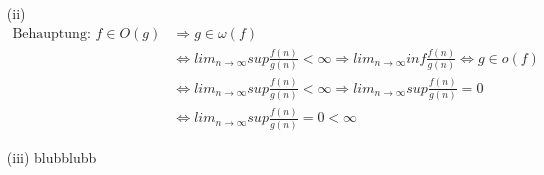 \documentclass{article}
\begin{document}
\begin{enumerate}
\begin{enumerate}
\item[(ii)]
	\begin{align*}
		\text{Behauptung: } f \in O(g) &\Rightarrow g \in \omega(f) \\
		&\Leftrightarrow lim_{n \rightarrow \infty} sup \frac{f(n)}{g(n)} 
			< \infty \Rightarrow lim_{n \rightarrow \infty} inf 
			\frac{f(n)}{g(n)} \Leftrightarrow g \in o(f) \\
		&\Leftrightarrow lim_{n \rightarrow \infty} sup \frac{f(n)}{g(n)} 
			< \infty \Rightarrow lim_{n \rightarrow \infty} sup
                        \frac{f(n)}{g(n)} = 0 \\
		&\Leftrightarrow lim_{n \rightarrow \infty} sup \frac{f(n)}{g(n)} = 0 
			< \infty 
	\end{align*}
\item[(iii)]
blubblubb
\end{enumerate}

\end{enumerate}
\end{document}
